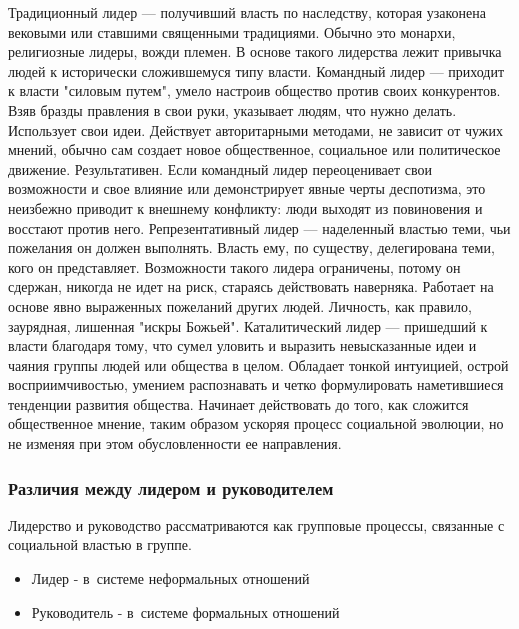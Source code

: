 \documentclass{../industrial-development}
\begin{document}
Традиционный лидер — получивший власть по наследству, которая узаконена вековыми или ставшими священными традициями. Обычно это монархи, религиозные лидеры, вожди племен. В основе такого лидерства лежит привычка людей к исторически сложившемуся типу власти.
Командный лидер — приходит к власти "силовым путем", умело настроив общество против своих конкурентов. Взяв бразды правления в свои руки, указывает людям, что нужно делать. Использует свои идеи. Действует авторитарными методами, не зависит от чужих мнений, обычно сам создает новое общественное, социальное или политическое движение. Результативен. Если командный лидер переоценивает свои возможности и свое влияние или демонстрирует явные черты деспотизма, это неизбежно приводит к внешнему конфликту: люди выходят из повиновения и восстают против него.
Репрезентативный лидер — наделенный властью теми, чьи пожелания он должен выполнять. Власть ему, по существу, делегирована теми, кого он представляет. Возможности такого лидера ограничены, потому он сдержан, никогда не идет на риск, стараясь действовать наверняка. Работает на основе явно выраженных пожеланий других людей. Личность, как правило, заурядная, лишенная "искры Божьей".
Каталитический лидер — пришедший к власти благодаря тому, что сумел уловить и выразить невысказанные идеи и чаяния группы людей или общества в целом. Обладает тонкой интуицией, острой восприимчивостью, умением распознавать и четко формулировать наметившиеся тенденции развития общества. Начинает действовать до того, как сложится общественное мнение, таким образом ускоряя процесс социальной эволюции, но не изменяя при этом обусловленности ее направления.

\begin{frame} \frametitle{Различия между лидером и руководителем}
Лидерство и руководство рассматриваются как групповые процессы, связанные с социальной властью в группе.\\
 \begin{itemize}
\item \alert{Лидер} - в~системе неформальных отношений
\item \alert{Руководитель} - в~системе формальных отношений
  \end{itemize}
\end{frame}

\lecturenotes
\end{document}
